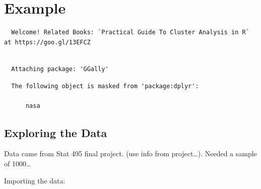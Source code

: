 \documentclass[12pt,twoside]{amherstthesis}
\begin{document}
  \chapter{Example}\label{typeset-equ}
  
  \begin{Shaded}
  \begin{Highlighting}[]
  \end{Highlighting}
  \end{Shaded}
  
  \begin{verbatim}
  Welcome! Related Books: `Practical Guide To Cluster Analysis in R` at https://goo.gl/13EFCZ
  \end{verbatim}
  
  \begin{Shaded}
  \begin{Highlighting}[]
  \end{Highlighting}
  \end{Shaded}
  
  \begin{verbatim}
  
  Attaching package: 'GGally'
  \end{verbatim}
  
  \begin{verbatim}
  The following object is masked from 'package:dplyr':
  
      nasa
  \end{verbatim}
  
  \section{Exploring the Data}\label{exploring-the-data}
  
  Data came from Stat 495 final project. (use info from project\ldots{}).
  Needed a sample of 1000\ldots{}
  
  Importing the data:
  
  \begin{Shaded}
  \begin{Highlighting}[]
  \StringTok{ }\NormalTok{(}\NormalTok{)}
  \end{Highlighting}
  \end{Shaded}
  
\end{document}
